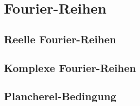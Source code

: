 %
%
%
\section{Fourier-Reihen
\label{section:fourier-reihen}}


\subsection{Reelle Fourier-Reihen}

\subsection{Komplexe Fourier-Reihen}

\subsection{Plancherel-Bedingung}

